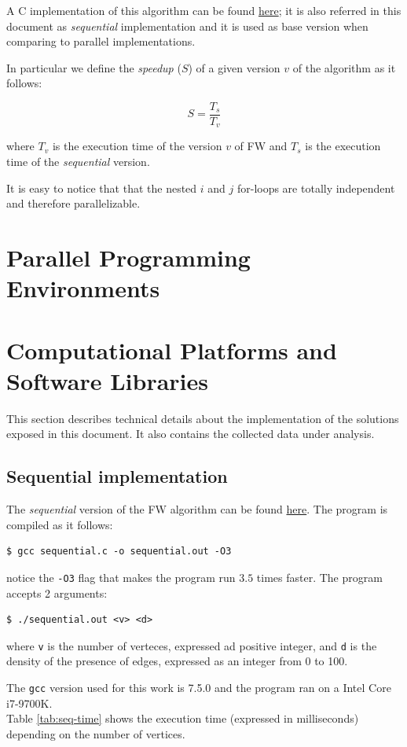 \documentclass[compsoc]{IEEEtran}
\begin{document}
A C implementation of this algorithm can be found \href{https://github.com/firaja/Parallel-FloydWarshall/blob/master/sequential.c}{here};
it is also referred in this document as \emph{sequential} implementation and it is used as base version when comparing to parallel implementations. \par \par



In particular we define the \emph{speedup} ($S$) of a given version $v$ of the algorithm as it follows:

\[S = \frac{T_{s}}{T_{v}}\]

where $T_v$ is the execution time of the version $v$ of FW and $T_s$ is the execution time of the \emph{sequential} version.

It is easy to notice that that the nested $i$ and $j$ for-loops are totally independent and therefore parallelizable.


\section{Parallel Programming Environments}

\section{Computational Platforms and Software Libraries}
This section describes technical details about the implementation of the solutions exposed in this document. It also contains
the collected data under analysis.
\subsection{Sequential implementation}
The \emph{sequential} version of the FW algorithm can be found \href{https://github.com/firaja/Parallel-FloydWarshall/blob/master/sequential.c}{here}. 
The program is compiled as it follows:
\begin{lstlisting}[basicstyle=\footnotesize\ttfamily]
$ gcc sequential.c -o sequential.out -O3
\end{lstlisting}

notice the \texttt{-O3} flag that makes the program run $3.5$ times faster.
The program accepts 2 arguments:
\begin{lstlisting}[basicstyle=\footnotesize\ttfamily]
$ ./sequential.out <v> <d>
\end{lstlisting}
where \texttt{v} is the number of verteces, expressed ad positive integer, and \texttt{d} is the density of the presence of edges, expressed as an integer from 0 to 100.
\par
The \texttt{gcc} version used for this work is 7.5.0 and the program ran on a Intel Core i7-9700K. \\
Table \ref{tab:seq-time} shows the execution time (expressed in milliseconds) depending on the number of vertices.
\end{document}
